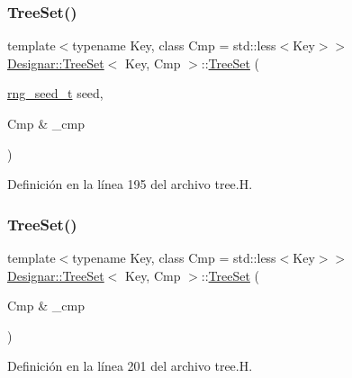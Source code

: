 \subsubsection{\texorpdfstring{Tree\+Set()}{TreeSet()}\hspace{0.1cm}{\footnotesize\ttfamily [1/7]}}
{\footnotesize\ttfamily template$<$typename Key, class Cmp = std\+::less$<$\+Key$>$$>$ \\
\hyperlink{class_designar_1_1_tree_set}{Designar\+::\+Tree\+Set}$<$ Key, Cmp $>$\+::\hyperlink{class_designar_1_1_tree_set}{Tree\+Set} (\begin{DoxyParamCaption}\item[{\hyperlink{namespace_designar_ad621b5646d45288c5d6a1e1dfe7531a8}{rng\+\_\+seed\+\_\+t}}]{seed,  }\item[{Cmp \&}]{\+\_\+cmp }\end{DoxyParamCaption})\hspace{0.3cm}{\ttfamily [inline]}}



Definición en la línea 195 del archivo tree.\+H.

\mbox{\label{class_designar_1_1_tree_set_adeb0456caadfe5e105d2070bf8405d47}} 
\subsubsection{\texorpdfstring{Tree\+Set()}{TreeSet()}\hspace{0.1cm}{\footnotesize\ttfamily [2/7]}}
{\footnotesize\ttfamily template$<$typename Key, class Cmp = std\+::less$<$\+Key$>$$>$ \\
\hyperlink{class_designar_1_1_tree_set}{Designar\+::\+Tree\+Set}$<$ Key, Cmp $>$\+::\hyperlink{class_designar_1_1_tree_set}{Tree\+Set} (\begin{DoxyParamCaption}\item[{Cmp \&}]{\+\_\+cmp }\end{DoxyParamCaption})\hspace{0.3cm}{\ttfamily [inline]}}



Definición en la línea 201 del archivo tree.\+H.

\mbox{\label{class_designar_1_1_tree_set_a41e2a227975e1e8adfe261adf99502e7}} 
